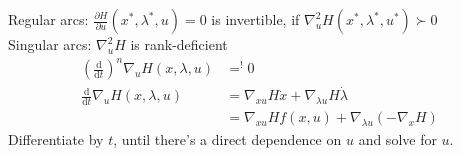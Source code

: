 \begin{tcolorbox}[colback=gray!5!white,colframe=gray!75!black,title=\textbf{Indirect Approach}]
Regular arcs: $\frac{\partial H}{\partial u}(x^*,\lambda^*, u) = 0$ is
invertible, if $\nabla^2_u H(x^*,\lambda^*,u^*)\succ 0$\\
Singular arcs: $\nabla^2_u H$ is rank-deficient\\
\begin{align*}
  \left(
  \frac{\mathrm{d}}{\mathrm{d}t}
\right)^n \nabla_u H(x,\lambda,u) &=^! 0 \\
\frac{\mathrm{d}}{\mathrm{d}t} \nabla_u H(x,\lambda,u) &= \nabla_{xu} H \dot{x} + \nabla_{\lambda u} H\dot{\lambda} \\
  &= \nabla_{x u} H f(x,u) + \nabla_{\lambda u}(-\nabla_x H)
\end{align*}
Differentiate by $t$, until there's a direct dependence on $u$ and solve for $u$.
\end{tcolorbox}
